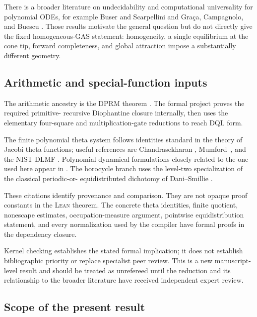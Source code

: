 \documentclass[11pt]{article}
\newcommand{\Lean}{\textsc{Lean}}
\begin{document}
There is a broader literature on undecidability and computational
universality for polynomial ODEs, for example Buser and Scarpellini
\cite{BuserScarpellini2007} and Gra\c ca, Campagnolo, and Buescu
\cite{GracaCampagnoloBuescu2008}.  Those results motivate the general
question but do not directly give the fixed homogeneous-GAS statement:
homogeneity, a single equilibrium at the cone tip, forward completeness,
and global attraction impose a substantially different geometry.

\subsection{Arithmetic and special-function inputs}

The arithmetic ancestry is the DPRM theorem
\cite{DavisPutnamRobinson1961,Matiyasevich1970,Matiyasevich1971,
Matiyasevich1993}.  The formal project proves the required primitive-
recursive Diophantine closure internally, then uses the elementary
four-square and multiplication-gate reductions to reach DQL form.

The finite polynomial theta system follows identities standard in the
theory of Jacobi theta functions; useful references are Chandrasekharan
\cite{Chandrasekharan1985}, Mumford~\cite{Mumford1983}, and the NIST DLMF
\cite{DLMF}.  Polynomial dynamical formulations closely related to the
one used here appear in
\cite{BrezhnevLyakhovichSharapov2011,Brezhnev2013}.  The horocycle branch
uses the level-two specialization of the classical periodic-or-
equidistributed dichotomy of Dani--Smillie
\cite{DaniSmillie1984,HubbardMiller2010}.

These citations identify provenance and comparison.  They are not opaque
proof constants in the \Lean{} theorem.  The concrete theta identities,
finite quotient, nonescape estimates, occupation-measure argument,
pointwise equidistribution statement, and every normalization used by the
compiler have formal proofs in the dependency closure.

Kernel checking establishes the stated formal implication; it does not
establish bibliographic priority or replace specialist peer review.  This
is a new manuscript-level result and should be treated as unrefereed until
the reduction and its relationship to the broader literature have received
independent expert review.

\subsection{Scope of the present result}
\end{document}
